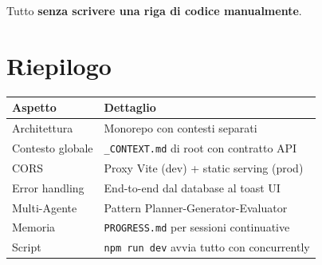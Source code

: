 Tutto \textbf{senza scrivere una riga di codice manualmente}.

\section*{Riepilogo}

\begin{center}
\begin{tabularx}{\textwidth}{l X}
\toprule
\textbf{Aspetto} & \textbf{Dettaglio} \\
\midrule
Architettura & Monorepo con contesti separati \\
Contesto globale & \texttt{\_CONTEXT.md} di root con contratto API \\
CORS & Proxy Vite (dev) + static serving (prod) \\
Error handling & End-to-end dal database al toast UI \\
Multi-Agente & Pattern Planner-Generator-Evaluator \\
Memoria & \texttt{PROGRESS.md} per sessioni continuative \\
Script & \texttt{npm run dev} avvia tutto con concurrently \\
\bottomrule
\end{tabularx}
\end{center}
